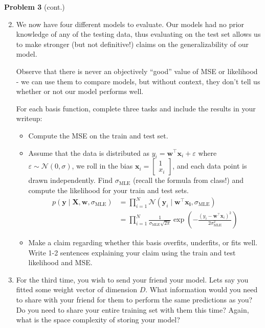\documentclass[submit]{harvardml}
\begin{document}
\newpage
\begin{framed}
\noindent\textbf{Problem 3} (cont.)\\
\begin{enumerate}
\setcounter{enumi}{1}
\item 

We now have four different models to evaluate. Our models had no
prior knowledge of any of the testing data, thus evaluating on
the test set allows us to make stronger (but not definitive!) 
claims on the generalizability of our model.

Observe that there is never an objectively ``good'' value of MSE or likelihood - we can use them to compare models, but without context, they don't tell us whether or not our model performs well.

For each basis function, complete three tasks and include the
results in your writeup: 
\begin{itemize}
\item Compute the MSE on the train and test set. 

\item Assume that the data is distributed as 
$y_i = \mathbf{w}^\top \mathbf{x}_i + \varepsilon$ where 
$\varepsilon \sim \mathcal{N}(0, \sigma)$, we roll in the bias 
$\mathbf{x}_i = \begin{bmatrix} 1 \\ x_i \end{bmatrix}$, and each data point
is drawn independently. Find $\sigma_{\text{MLE}}$ (recall the formula from class!) and compute the 
likelihood for your train and test sets. 
\begin{align*} p(\mathbf{y}\mid \mathbf{X},\mathbf{w},\sigma_{\text{MLE}}) 
&= \prod_{i=1}^N \mathcal{N}(\mathbf{y}_i \mid \mathbf{w}^\top\mathbf{x_i}, \sigma_{\text{MLE}}) \\
&= \prod_{i=1}^N \frac{1}{\sigma_{\text{MLE}}\sqrt{2\pi}}\exp\left(-\frac{(y_i - \mathbf{w}^\top \mathbf{x}_i)^2}{2\sigma_{\text{MLE}}^2}\right)
\end{align*}

\item Make a claim regarding whether this basis overfits, 
underfits, or fits well. Write 1-2 sentences explaining your 
claim using the train and test likelihood and MSE.


\end{itemize}
\item For the third time, you wish to send your friend your model. Lets say you fitted some weight vector of dimension $D$. What information would you need to share with your friend for them to perform the same predictions as you? Do you need to share your entire training set with them this time? Again, what is the space complexity of storing your model?


\end{enumerate}
\end{framed}
\end{document}
